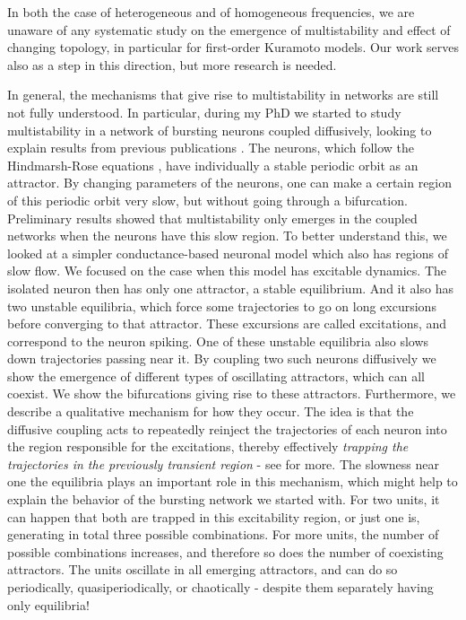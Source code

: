 In both the case of heterogeneous and of homogeneous frequencies, we are unaware of any systematic study on the emergence of multistability and effect of changing topology, in particular for first-order Kuramoto models. Our work serves also as a step in this direction, but more research is needed. 

In general, the mechanisms that give rise to multistability in networks are still not fully understood. In particular, during my PhD we started to study multistability in a network of bursting neurons coupled diffusively, looking to explain results from previous publications \cite{rossi2021phase}. The neurons, which follow the Hindmarsh-Rose equations \cite{hindmarsh1984a}, have individually a stable periodic orbit as an attractor. By changing parameters of the neurons, one can make a certain region of this periodic orbit very slow, but without going through a bifurcation. Preliminary results showed that multistability only emerges in the coupled networks when the neurons have this slow region. To better understand this, we looked at a simpler conductance-based neuronal model \cite{izhikevichbook} which also has regions of slow flow. We focused on the case when this model has excitable dynamics. The isolated neuron then has only one attractor, a stable equilibrium. And it also has two unstable equilibria, which force some trajectories to go on long excursions before converging to that attractor. These excursions are called excitations, and correspond to the neuron spiking. One of these unstable equilibria also slows down trajectories passing near it. By coupling two such neurons diffusively we show the emergence of different types of oscillating attractors, which can all coexist. We show the bifurcations giving rise to these attractors. Furthermore, we describe a qualitative mechanism for how they occur. The idea is that the diffusive coupling acts to repeatedly reinject the trajectories of each neuron into the region responsible for the excitations, thereby effectively \textit{trapping the trajectories in the previously transient region} - see  for more. The slowness near one the equilibria plays an important role in this mechanism, which might help to explain the behavior of the bursting network we started with. For two units, it can happen that both are trapped in this excitability region, or just one is, generating in total three possible combinations. For more units, the number of possible combinations increases, and therefore so does the number of coexisting attractors. The units oscillate in all emerging attractors, and can do so periodically, quasiperiodically, or chaotically - despite them separately having only equilibria!  
